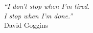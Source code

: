 \cleardoublepage
\thispagestyle{plain}

\vspace*{8cm}

\begin{flushright}
   \textsl{``I don't stop when I'm tired.\\
             I stop when I'm done.''} \\
\vspace*{1.5cm}
           David Goggins
\end{flushright}
